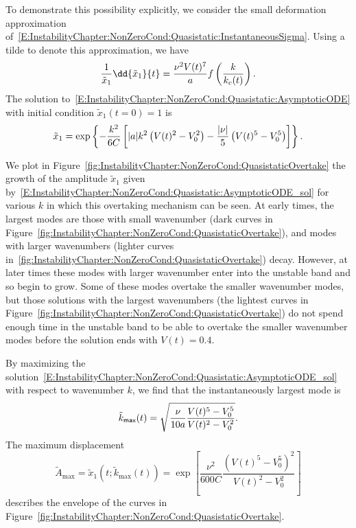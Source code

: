 To demonstrate this possibility explicitly, we consider the small deformation approximation of~\eqref{E:InstabilityChapter:NonZeroCond:Quasistatic:InstantaneousSigma}. Using a tilde to denote this approximation, we have
\begin{equation}\label{E:InstabilityChapter:NonZeroCond:Quasistatic:AsymptoticODE}
\frac{1}{\tilde{x}_1}\dd{\tilde{x}_1}{t}  = \frac{\nu^2 V(t)^7}{\aspect}f\left(\frac{k}{k_c(t)}\right).
\end{equation}
The solution to~\eqref{E:InstabilityChapter:NonZeroCond:Quasistatic:AsymptoticODE} with initial condition $\tilde{x}_1(t = 0) = 1$ is
\begin{equation}\label{E:InstabilityChapter:NonZeroCond:Quasistatic:AsymptoticODE_sol}
\tilde{x}_1= \exp\left\{-\frac{k^2}{6C}\left[|a| k^2 \left(V(t)^2 - V_0^2\right) - \frac{|\nu|}{5}\left(V(t)^5 - V_0^5\right)\right]\right\}.
\end{equation}

We plot in Figure~\ref{fig:InstabilityChapter:NonZeroCond:QuasistaticOvertake} the growth of the amplitude $\tilde{x}_1$ given by~\eqref{E:InstabilityChapter:NonZeroCond:Quasistatic:AsymptoticODE_sol} for various $k$ in which this overtaking mechanism can be seen. At early times, the largest modes are those with small wavenumber (dark curves in Figure~\ref{fig:InstabilityChapter:NonZeroCond:QuasistaticOvertake}), and modes with larger wavenumbers (lighter curves in~\ref{fig:InstabilityChapter:NonZeroCond:QuasistaticOvertake}) decay. However, at later times these modes with larger wavenumber enter into the unstable band and so begin to grow. Some of these modes overtake the smaller wavenumber modes, but those solutions with the largest wavenumbers (the lightest curves in Figure~\ref{fig:InstabilityChapter:NonZeroCond:QuasistaticOvertake}) do not spend enough time in the unstable band to be able to overtake the smaller wavenumber modes before the solution ends with $V(t) = 0.4$.

By maximizing the solution~\eqref{E:InstabilityChapter:NonZeroCond:Quasistatic:AsymptoticODE_sol} with respect to wavenumber $k$, we find that the instantaneously largest mode is
\begin{equation}\label{E:InstabilityChapter:NonZeroCond:Quasistatic:AsymptoticODE_envelopeK}
\tilde{k}_{\textsf{max}}(t) = \sqrt{\frac{\nu}{10a}\frac{V(t)^5 - V_0^5}{V(t)^2 - V_0^2}}.
\end{equation}
The maximum displacement
\begin{equation}\label{E:InstabilityChapter:NonZeroCond:Quasistatic:AsymptoticODE_envelopeSigma}  \tilde{A}_{\text{max} }= \tilde{x}_1\left(t; \tilde{k}_{\text{max}}(t)\right) = \exp \left[\frac{\nu^2}{600C}\frac{\left(V(t)^5 - V_0^5\right)^2}{V(t)^2 - V_0^2}\right]
\end{equation}
describes the envelope of the curves in Figure~\ref{fig:InstabilityChapter:NonZeroCond:QuasistaticOvertake}.

